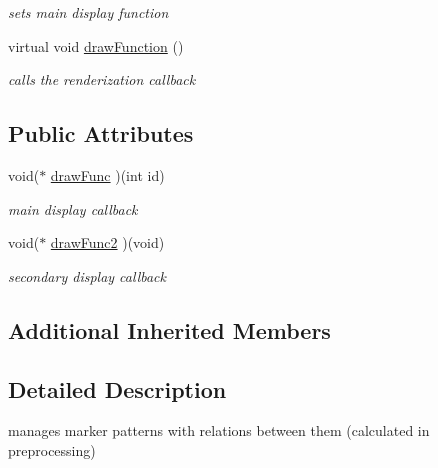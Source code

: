 \begin{DoxyCompactItemize}
\begin{DoxyCompactList}\small\item\em sets main display function \end{DoxyCompactList}\item 
\hypertarget{classavr_system_multi_a0c32328ce187e8c040ed7ac0ae10ceeb}{virtual void \hyperlink{classavr_system_multi_a0c32328ce187e8c040ed7ac0ae10ceeb}{draw\-Function} ()}\label{classavr_system_multi_a0c32328ce187e8c040ed7ac0ae10ceeb}

\begin{DoxyCompactList}\small\item\em calls the renderization callback \end{DoxyCompactList}\end{DoxyCompactItemize}
\subsection*{Public Attributes}
\begin{DoxyCompactItemize}
\item 
\hypertarget{classavr_system_multi_afb9a6363fb5550c6a180fa1a42a5d7c1}{void($\ast$ \hyperlink{classavr_system_multi_afb9a6363fb5550c6a180fa1a42a5d7c1}{draw\-Func} )(int id)}\label{classavr_system_multi_afb9a6363fb5550c6a180fa1a42a5d7c1}

\begin{DoxyCompactList}\small\item\em main display callback \end{DoxyCompactList}\item 
\hypertarget{classavr_system_multi_ab1bc1f44dc7b9a3438355ed8a0ef5f65}{void($\ast$ \hyperlink{classavr_system_multi_ab1bc1f44dc7b9a3438355ed8a0ef5f65}{draw\-Func2} )(void)}\label{classavr_system_multi_ab1bc1f44dc7b9a3438355ed8a0ef5f65}

\begin{DoxyCompactList}\small\item\em secondary display callback \end{DoxyCompactList}\end{DoxyCompactItemize}
\subsection*{Additional Inherited Members}


\subsection{Detailed Description}
manages marker patterns with relations between them (calculated in preprocessing) 


